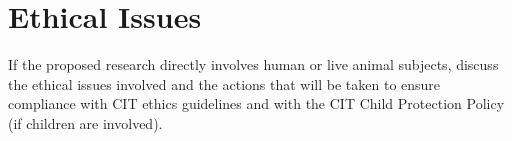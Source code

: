 \chapter{Ethical Issues}
If the proposed research directly involves human or live animal subjects, discuss the ethical issues involved and the actions that will be taken to ensure compliance with CIT ethics guidelines and with the CIT Child Protection Policy (if children are involved).
